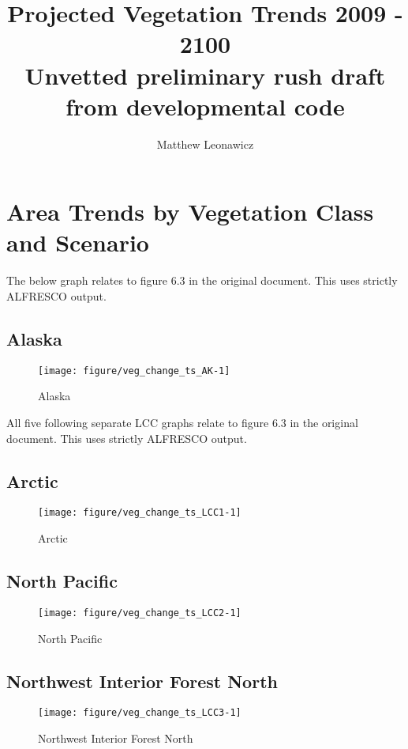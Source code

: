\documentclass{article}\usepackage[]{graphicx}\usepackage[]{color}
\makeatletter
\def\maxwidth{ %
  \ifdim\Gin@nat@width>\linewidth
    \linewidth
  \else
    \Gin@nat@width
  \fi
}
\makeatother
\begin{document}
\title{Projected Vegetation Trends 2009 - 2100 \\ \large Unvetted preliminary rush draft from developmental code}
\author{Matthew Leonawicz}
\maketitle

\setlength{\aboverulesep}{0.2pt}
\setlength{\belowrulesep}{0.2pt}





\section{Area Trends by Vegetation Class and Scenario}
The below graph relates to figure 6.3 in the original document.
This uses strictly ALFRESCO output.

\subsection{Alaska}
\begin{figure}[H]
\texttt{[image: figure/veg\_change\_ts\_AK-1]} \caption[Alaska]{Alaska}\label{fig:veg_change_ts_AK}
\end{figure}



All five following separate LCC graphs relate to figure 6.3 in the original document.
This uses strictly ALFRESCO output.

\subsection{Arctic}
\begin{figure}[H]
\texttt{[image: figure/veg\_change\_ts\_LCC1-1]} \caption[Arctic]{Arctic}\label{fig:veg_change_ts_LCC1}
\end{figure}



\subsection{North Pacific}
\begin{figure}[H]
\texttt{[image: figure/veg\_change\_ts\_LCC2-1]} \caption[North Pacific]{North Pacific}\label{fig:veg_change_ts_LCC2}
\end{figure}



\subsection{Northwest Interior Forest North}
\begin{figure}[H]
\texttt{[image: figure/veg\_change\_ts\_LCC3-1]} \caption[Northwest Interior Forest North]{Northwest Interior Forest North}\label{fig:veg_change_ts_LCC3}
\end{figure}
\end{document}
